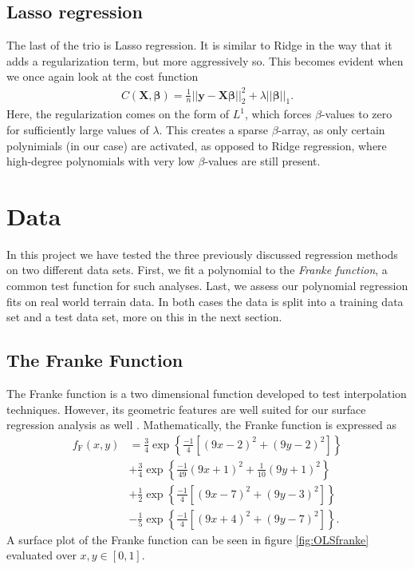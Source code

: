 \documentclass[a4paper, twocolumn]{article}
\begin{document}
\subsection{Lasso regression}
The last of the trio is Lasso regression. It is similar to Ridge in the way that it adds a regularization term, but more aggressively so. This becomes evident when we once again look at the cost function
\begin{align}
  C(\boldsymbol{X},\boldsymbol{\beta})=\frac{1}{n}\vert\vert \boldsymbol{y}-\boldsymbol{X}\boldsymbol{\beta}\vert\vert_2^2+\lambda\vert\vert \boldsymbol{\beta}\vert\vert_1.
\end{align}
Here, the regularization comes on the form of $L^1$, which forces $\beta$-values to zero for sufficiently large values of $\lambda$. This creates a sparse $\beta$-array, as only certain polynimials (in our case) are activated, as opposed to Ridge regression, where high-degree polynomials with very low $\beta$-values are still present.

\section{Data}
In this project we have tested the three previously discussed regression methods on two different data sets. First, we fit a polynomial to the \textit{Franke function}, a common test function for such analyses. Last, we assess our polynomial regression fits on real world terrain data. In both cases the data is split into a training data set and a test data set, more on this in the next section.
\subsection{The Franke Function}
The Franke function is a two dimensional function developed to test interpolation techniques. However, its geometric features are well suited for our surface regression analysis as well \autocite{franke}. Mathematically, the Franke function is expressed as
\begin{align}
f_\text{F}(x,y) &= \frac{3}{4}\exp\left\{\frac{-1}{4}\left[\left(9x-2\right)^2 + \left(9y-2\right)^2\right]\right\}\nonumber \\
&+ \frac{3}{4}\exp\left\{\frac{-1}{49}\left(9x+1\right)^2 + \frac{1}{10}\left(9y+1\right)^2\right\}\nonumber \\
&+ \frac{1}{2}\exp\left\{\frac{-1}{4}\left[\left(9x-7\right)^2 + \left(9y-3\right)^2\right]\right\}\nonumber \\
&- \frac{1}{5}\exp\left\{\frac{-1}{4}\left[\left(9x+4\right)^2 + \left(9y-7\right)^2\right]\right\}.
\end{align}
A surface plot of the Franke function can be seen in figure \ref{fig:OLSfranke} evaluated over $x,y \in [0,1]$. 
\end{document}
